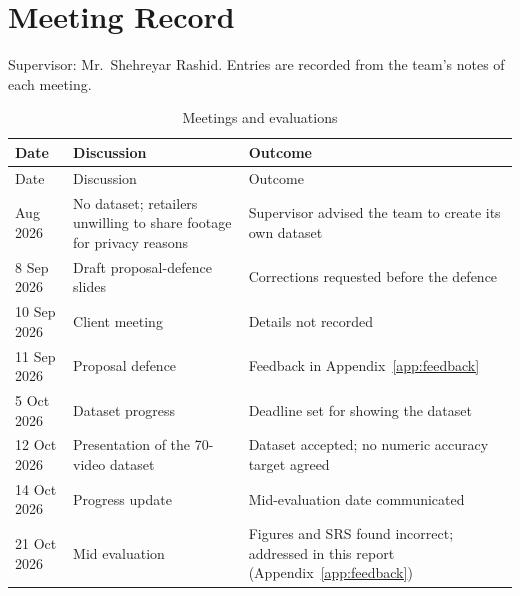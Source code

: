 \chapter{Meeting Record}
\label{app:meetings}
Supervisor: Mr.\ Shehreyar Rashid. Entries are recorded from the team's notes of each meeting.

\begin{longtable}{P{0.17\textwidth}P{0.38\textwidth}P{0.37\textwidth}}
\caption{Meetings and evaluations}\label{tab:meetings}\\
\toprule
Date & Discussion & Outcome\\
\midrule
\endfirsthead
\toprule
Date & Discussion & Outcome\\
\midrule
\endhead
\bottomrule
{} Aug 2026 & No dataset; retailers unwilling to share footage for privacy reasons & Supervisor advised the team to create its own dataset\\
8 Sep 2026 & Draft proposal-defence slides & Corrections requested before the defence\\
10 Sep 2026 & Client meeting & Details not recorded\\
11 Sep 2026 & Proposal defence & Feedback in Appendix~\ref{app:feedback}\\
5 Oct 2026 & Dataset progress & Deadline set for showing the dataset\\
12 Oct 2026 & Presentation of the 70-video dataset & Dataset accepted; no numeric accuracy target agreed\\
14 Oct 2026 & Progress update & Mid-evaluation date communicated\\
21 Oct 2026 & Mid evaluation & Figures and SRS found incorrect; addressed in this report (Appendix~\ref{app:feedback})\\
\end{longtable}
